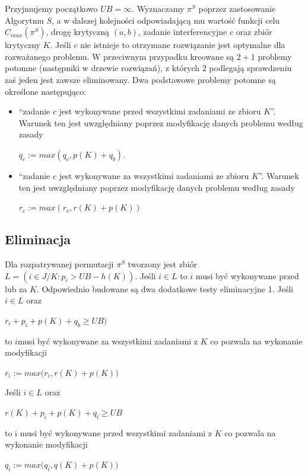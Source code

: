 \documentclass[11pt]{article}
\begin{document}
Przyjmujemy początkowo $UB = \infty$. Wyznaczamy $\pi^S$ poprzez zastosowanie Algorytmu $S$, a w dalszej kolejności odpowiadającą mu wartość funkcji celu $C_{max}(\pi^S)$, drogę krytyczną $(a, b)$, zadanie interferencyjne $c$ oraz zbiór krytyczny $K$. Jeśli $c$ nie istnieje to otrzymane rozwiązanie jest optymalne dla rozważanego problemu. W przeciwnym przypadku kreowane są $2+1$ problemy potomne (następniki w drzewie rozwiązań), z których $2$ podlegają sprawdzeniu zaś jeden jest zawsze eliminowany. Dwa podstawowe problemy potomne są określone następująco:

\begin{itemize}
\item “zadanie $c$ jest wykonywane przed wszystkimi zadaniami ze zbioru $K$”. Warunek ten jest uwzględniany poprzez modyfikację danych problemu według zasady
\begin{center}
  $q_c := max{(q_c, p(K) + q_b)}$.
\end{center}
\item “zadanie $c$ jest wykonywane za wszystkimi zadaniami ze zbioru $K$”. Warunek ten jest uwzględniany poprzez modyfikację danych problemu według zasady
\begin{center}
   $r_c := max{(r_c, r(K) + p(K))}$
\end{center}
\end{itemize}

\subsection{Eliminacja}
Dla rozpatrywanej permutacji $\pi^S$ tworzony jest zbiór
 $L = {(i \in J / K : p_i > UB - h(K))}$.
 Jeśli $i \in L$ to $i$ musi być wykonywane przed lub za $K$. Odpowiednio budowane są dwa dodatkowe testy eliminacyjne 1. Jeśli $i \in L$ oraz
 \begin{center}
 $r_i + p_i + p(K) + q_b \ge UB)$
 \end{center}
 
to $i$musi być wykonywane za wszystkimi zadaniami z $K$ co pozwala na wykonanie modyfikacji
\begin{center}
$r_i := max({r_i , r(K) + p(K))} $
\end{center}

 Jeśli  $i \in L$ oraz
 \begin{center}
 $r(K) + p_i + p(K) + q_i\ge UB$
 \end{center}
 
 to i musi być wykonywane przed wszystkimi zadaniami z $K$ co pozwala na wykonanie modyfikacji 
 \begin{center}
 $q_i := max({q_i , q(K) + p(K))}$
 \end{center}
\end{document}
